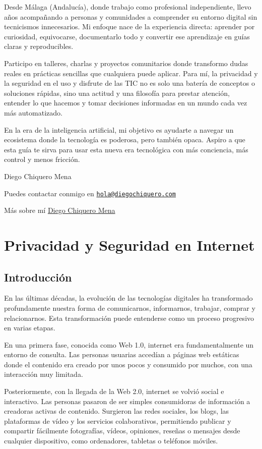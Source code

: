 \documentclass[
  spanish,
  a4paper,
  openany]{book}
\begin{document}
Desde Málaga (Andalucía), donde trabajo como profesional independiente, llevo años acompañando a personas y comunidades a comprender su entorno digital sin tecnicismos innecesarios. Mi enfoque nace de la experiencia directa: aprender por curiosidad, equivocarse, documentarlo todo y convertir ese aprendizaje en guías claras y reproducibles.

Participo en talleres, charlas y proyectos comunitarios donde transformo dudas reales en prácticas sencillas que cualquiera puede aplicar. Para mí, la privacidad y la seguridad en el uso y disfrute de las TIC no es solo una batería de conceptos o soluciones rápidas, sino una actitud y una filosofía para prestar atención, entender lo que hacemos y tomar decisiones informadas en un mundo cada vez más automatizado.

En la era de la inteligencia artificial, mi objetivo es ayudarte a navegar un ecosistema donde la tecnología es poderosa, pero también opaca. Aspiro a que esta guía te sirva para usar esta nueva era tecnológica con más conciencia, más control y menos fricción.

Diego Chiquero Mena

Puedes contactar conmigo en \href{mailto:hola@diegochiquero.com}{\nolinkurl{hola@diegochiquero.com}}

Más sobre mí \href{https://diegochiquero.com}{Diego Chiquero Mena}

\chapter{Privacidad y Seguridad en Internet}\label{privacidad-y-seguridad-en-internet}

\section{Introducción}\label{introducciuxf3n}

En las últimas décadas, la evolución de las tecnologías digitales ha transformado profundamente nuestra forma de comunicarnos, informarnos, trabajar, comprar y relacionarnos. Esta transformación puede entenderse como un proceso progresivo en varias etapas.

En una primera fase, conocida como Web 1.0, internet era fundamentalmente un entorno de consulta. Las personas usuarias accedían a páginas web estáticas donde el contenido era creado por unos pocos y consumido por muchos, con una interacción muy limitada.

Posteriormente, con la llegada de la Web 2.0, internet se volvió social e interactivo. Las personas pasaron de ser simples consumidoras de información a creadoras activas de contenido. Surgieron las redes sociales, los blogs, las plataformas de vídeo y los servicios colaborativos, permitiendo publicar y compartir fácilmente fotografías, vídeos, opiniones, reseñas o mensajes desde cualquier dispositivo, como ordenadores, tabletas o teléfonos móviles.
\end{document}
